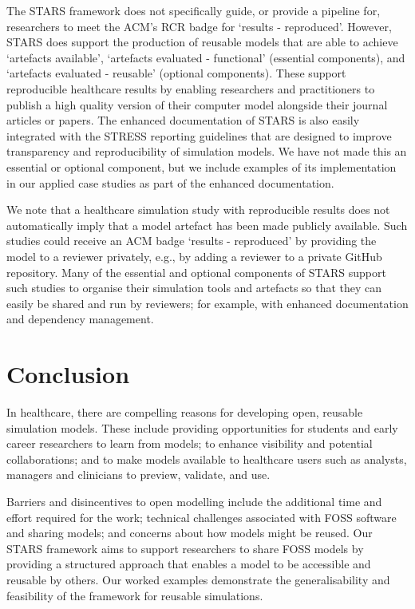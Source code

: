 \documentclass[]{interact}
\theoremstyle{plain}%
\theoremstyle{definition}
\theoremstyle{remark}
\begin{document}
The STARS framework does not specifically guide, or provide a pipeline for, researchers to meet the ACM's RCR badge for `results - reproduced'. However, STARS does support the production of reusable models that are able to achieve `artefacts available', `artefacts evaluated - functional' (essential components), and `artefacts evaluated - reusable' (optional components). These support reproducible healthcare results by enabling researchers and practitioners to publish a high quality version of their computer model alongside their journal articles or papers. The enhanced documentation of STARS is also easily integrated with the STRESS reporting guidelines \citep{monks2019strengthening} that are designed to improve transparency and reproducibility of simulation models.  We have not made this an essential or optional component, but we include examples of its implementation in our applied case studies as part of the enhanced documentation. 

We note that a healthcare simulation study with reproducible results does not automatically imply that a model artefact has been made publicly available. Such studies could receive an ACM badge `results - reproduced' by providing the model to a reviewer privately, e.g., by adding a reviewer to a private GitHub repository. Many of the essential and optional components of STARS support such studies to organise their simulation tools and artefacts so that they can easily be shared and run by reviewers; for example, with enhanced documentation and dependency management.

\section{Conclusion}
In healthcare, there are compelling reasons for developing open, reusable simulation models. These include providing opportunities for students and early career researchers to learn from models; to enhance visibility and potential collaborations; and to make models available to healthcare users such as analysts, managers and clinicians to preview, validate, and use. 

Barriers and disincentives to open modelling include the additional time and effort required for the work; technical challenges associated with FOSS software and sharing models; and concerns about how models might be reused. Our STARS framework aims to support researchers to share FOSS models by providing a structured approach that enables a model to be accessible and reusable by others. Our worked examples demonstrate the generalisability and feasibility of the framework for reusable simulations. 
\end{document}
